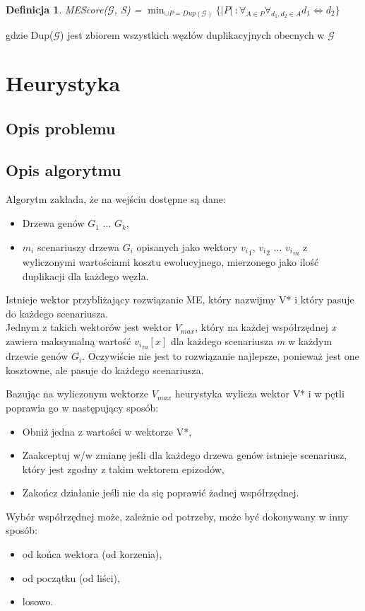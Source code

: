 \documentclass[licencjacka]{pracamgr}
\newtheorem{defi}{Definicja}[section]
\begin{document}
\begin{defi}\label{ME}
  MEScore($\mathcal{G}$, S) = $\min_{\cup P = Dup(\mathcal{G})} \lbrace \vert P \vert\ : \forall_{A \in P} \forall_{d_1,d_2 \in A} d_1 \Longleftrightarrow d_2 \rbrace$
\end{defi}
 gdzie Dup($\mathcal{G}$) jest zbiorem wszystkich węzłów duplikacyjnych obecnych w $\mathcal{G}$


\chapter{Heurystyka}\label{r:heurystyka}

\section{Opis problemu}


\section{Opis algorytmu}

Algorytm zakłada, że na wejściu dostępne są dane:
\begin{itemize}
\item Drzewa genów $G_1$ ... $G_k$,
\item $m_i$ scenariuszy drzewa $G_i$ opisanych jako wektory ${v_i}_1$, ${v_i}_2$ ... ${v_i}_m$ z wyliczonymi wartościami kosztu ewolucyjnego, mierzonego jako ilość duplikacji dla każdego węzła.
\end{itemize}
Istnieje wektor przybliżający rozwiązanie ME, który nazwijmy V* i który pasuje do każdego scenariusza. \\
Jednym z takich wektorów jest wektor $V_{max}$, który na każdej współrzędnej \textit{x} zawiera maksymalną wartość ${{v_i}_m}[x]$ dla każdego scenariusza \textit{m} w każdym drzewie genów $G_i$. Oczywiście nie jest to rozwiązanie najlepsze, ponieważ jest one kosztowne, ale pasuje do każdego scenariusza.

Bazując na wyliczonym wektorze $V_{max}$ heurystyka wylicza wektor V* i w pętli poprawia go w następujący sposób:
\begin{itemize}
\item Obniż jedna z wartości w wektorze V*,
\item Zaakceptuj w/w zmianę jeśli dla każdego drzewa genów istnieje scenariusz, który jest zgodny z takim wektorem epizodów,
\item Zakończ działanie jeśli nie da się poprawić żadnej współrzędnej.
\end{itemize}
Wybór współrzędnej może, zależnie od potrzeby, może być dokonywany w inny sposób:
\begin{itemize}
\item od końca wektora (od korzenia),
\item od początku (od liści),
\item losowo.
\end{itemize}
\end{document}
